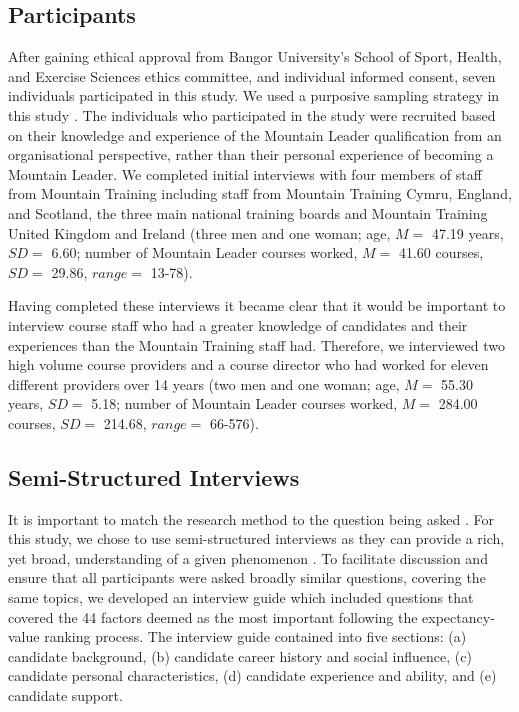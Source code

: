 \documentclass[
  12pt,
  a4paper,
]{book}
\begin{document}
\hypertarget{participants}{%
\subsection{Participants}\label{participants}}

After gaining ethical approval from Bangor University's School of Sport, Health, and Exercise Sciences ethics committee, and individual informed consent, seven individuals participated in this study. We used a purposive sampling strategy in this study \citep{Patton2002, Sparkes2014}. The individuals who participated in the study were recruited based on their knowledge and experience of the Mountain Leader qualification from an organisational perspective, rather than their personal experience of becoming a Mountain Leader. We completed initial interviews with four members of staff from Mountain Training including staff from Mountain Training Cymru, England, and Scotland, the three main national training boards and Mountain Training United Kingdom and Ireland (three men and one woman; age, \(M =\) 47.19 years, \(SD =\) 6.60; number of Mountain Leader courses worked, \(M =\) 41.60 courses, \(SD =\) 29.86, \(range =\) 13-78).

Having completed these interviews it became clear that it would be important to interview course staff who had a greater knowledge of candidates and their experiences than the Mountain Training staff had. Therefore, we interviewed two high volume course providers and a course director who had worked for eleven different providers over 14 years (two men and one woman; age, \(M =\) 55.30 years, \(SD =\) 5.18; number of Mountain Leader courses worked, \(M =\) 284.00 courses, \(SD =\) 214.68, \(range =\) 66-576).

\hypertarget{semi-structured-interviews}{%
\subsection{Semi-Structured Interviews}\label{semi-structured-interviews}}

It is important to match the research method to the question being asked \citep{Smith2016}. For this study, we chose to use semi-structured interviews as they can provide a rich, yet broad, understanding of a given phenomenon \citep{Lincoln1985}. To facilitate discussion and ensure that all participants were asked broadly similar questions, covering the same topics, we developed an interview guide which included questions that covered the 44 factors deemed as the most important following the expectancy-value ranking process. The interview guide contained into five sections: (a) candidate background, (b) candidate career history and social influence, (c) candidate personal characteristics, (d) candidate experience and ability, and (e) candidate support.
\end{document}
